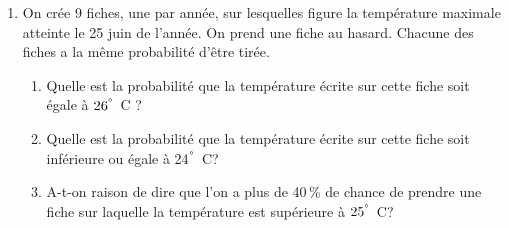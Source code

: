 \documentclass[exercice,a4]{thedocument}%
\begin{document}
\medskip

\begin{enumerate}[resume]
\item  On crée 9 fiches, une par année, sur lesquelles figure la température maximale atteinte le 25 juin de l'année. On prend une fiche au hasard. Chacune des fiches a la même probabilité d'être tirée.
	\begin{enumerate}
		\item Quelle est la probabilité que la température écrite sur cette fiche soit égale à $26\textsuperscript{\textdegree}$~C ?
		\item Quelle est la probabilité que la température écrite sur cette fiche soit inférieure ou égale à 24$\textsuperscript{\textdegree}$~C?
		\item A-t-on raison de dire que l'on a plus de 40\,\% de chance de prendre une fiche sur laquelle la température est supérieure à $25\textsuperscript{\textdegree}$~C?
	\end{enumerate}
\end{enumerate}

\newpage
\showthesource
\end{document}
